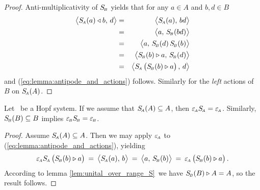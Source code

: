 \begin{proof}
Anti-multiplicativity of\/ $S_{\scriptscriptstyle \! B}$ yields that for any $a \in A$ and $b,d \in B$
\begin{eqnarray*}
      \pairM{\SA(a) \ract b}{d}
  &=&
      \pairM{\SA(a)}{bd}
\\&=&
      \pairM{a}{\SB(bd)}
\\&=&
      \pairM{a}{\SB(d)\,\SB(b)}
\\&=&
      \pairM{\SB(b) \lact a}{\SB(d)}
\\&=&
      \pairM{\SA\left(\vertM  \SB(b) \lact a\right)}{d}
\end{eqnarray*}
and (\ref{eq:lemma:antipode_and_actions}) follows.
Similarly for the {\em left\/} actions of $B$ on $S_{\scriptscriptstyle \! A}(A)$.
\end{proof}


\begin{cor_sec}  \label{cor:antipode_and_counit}
Let\/ \pairAB\ be a Hopf system.
If we assume that\/ $S_{\scriptscriptstyle \! A}(A) \subseteq A$, then\/ $\varepsilon_{\scriptscriptstyle \! A} S_{\scriptscriptstyle \! A} = \varepsilon_{\scriptscriptstyle \! A}$.
Similarly, $S_{\scriptscriptstyle \! B}(B) \subseteq B$ implies\/ $\varepsilon_{\scriptscriptstyle \! B} S_{\scriptscriptstyle \! B} = \varepsilon_{\scriptscriptstyle \! B}$.
\end{cor_sec}

\begin{proof}
Assume $S_{\scriptscriptstyle \! A}(A) \subseteq A$.
Then we may apply $\varepsilon_{\scriptscriptstyle \! A}$ to (\ref{eq:lemma:antipode_and_actions}), yielding
$$ \epsA \SA \left(\vertM  \SB(b) \lact a\right)
     \:=\:  \pairM{\SA(a)}{b}
     \:=\:  \pairM{a}{\SB(b)}
     \:=\:  \epsA \left(\vertM \SB(b) \lact a \right).   $$
According to lemma \ref{lem:unital_over_range_S}\ we have $S_{\scriptscriptstyle \! B}(B) \triangleright A = A$,
so the result follows.
\end{proof}
